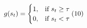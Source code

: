 \documentclass[preview,border=3pt]{standalone}
\begin{document}
\begin{minipage}{3.42in}
\fontsize{12.5pt}{15.5pt}\selectfont
\begin{equation*}
g(s_t) = \begin{cases} 1, & \text{if } s_t \ge \tau \\ 0, & \text{if } s_t < \tau \end{cases} \hfill (10)
\end{equation*}
\end{minipage}
\end{document}
